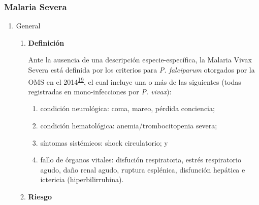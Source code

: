 \documentclass[]{article}
\providecommand{\tightlist}{%
  \setlength{\itemsep}{0pt}\setlength{\parskip}{0pt}}
\begin{document}
\subsubsection{Malaria Severa}\label{malaria-severa}

\begin{enumerate}
\def\labelenumi{\alph{enumi}.}
\item
  General

  \begin{enumerate}
  \def\labelenumii{\roman{enumii}.}
  \item
    \textbf{Definición}

    Ante la ausencia de una descripción especie-específica, la Malaria
    Vivax Severa está definida por los criterios para \emph{P.
    falciparum} otorgados por la OMS en el
    2014\textsuperscript{\protect\hyperlink{ref-WHO2014severe}{19}}, el
    cual incluye una o más de las siguientes (todas registradas en
    mono-infecciones por \emph{P. vivax}):

    \begin{enumerate}
    \def\labelenumiii{\arabic{enumiii}.}
    \tightlist
    \item
      condición neurológica: coma, mareo, pérdida conciencia;
    \item
      condición hematológica: anemia/trombocitopenia severa;
    \item
      síntomas sistémicos: shock circulatorio; y
    \item
      fallo de órganos vitales: disfución respiratoria, estrés
      respiratorio agudo, daño renal agudo, ruptura esplénica,
      disfunción hepática e ictericia (hiperbilirrubina).
    \end{enumerate}
  \item
    \textbf{Riesgo}


\end{enumerate}
\end{enumerate}
\end{document}
